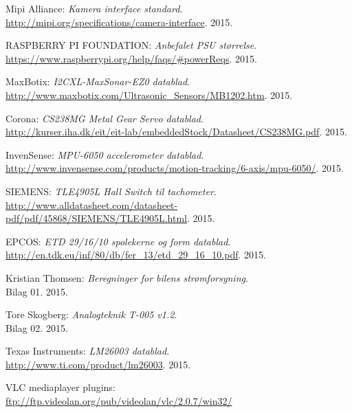 \renewcommand{\bibname}{Litteraturliste}
\fancyhead[CE,CO]{}
\fancyfoot[CE,CO]{}
\begin{thebibliography}{2}


 Mipi Alliance: \textit{Kamera interface standard}. \\ 
\url{http://mipi.org/specifications/camera-interface}. 2015.

 RASPBERRY PI FOUNDATION: \textit{Anbefalet PSU størrelse}. \\
\url{https://www.raspberrypi.org/help/faqs/#powerReqs}. 2015.

 MaxBotix: \textit{I2CXL-MaxSonar-EZ0 datablad}. \\
\url{http://www.maxbotix.com/Ultrasonic_Sensors/MB1202.htm}. 2015.

 Corona: \textit{CS238MG Metal Gear Servo datablad}. \\
\url{http://kurser.iha.dk/eit/eit-lab/embeddedStock/Datasheet/CS238MG.pdf}. 2015.

 InvenSense: \textit{MPU-6050 accelerometer datablad}. \\
\url{http://www.invensense.com/products/motion-tracking/6-axis/mpu-6050/}. 2015.

 SIEMENS: \textit{TLE4905L Hall Switch til tachometer}. \\
\url{http://www.alldatasheet.com/datasheet-pdf/pdf/45868/SIEMENS/TLE4905L.html}. 2015.

 EPCOS: \textit{ETD 29/16/10 spolekerne og form datablad}. \\
\url{http://en.tdk.eu/inf/80/db/fer_13/etd_29_16_10.pdf}. 2015.

 Kristian Thomsen: \textit{Beregninger for bilens strømforsyning}. \\
Bilag 01. 2015.

 Tore Skogberg: \textit{Analogteknik T-005 v1.2}.\\
Bilag 02. 2015.

 Texas Instruments: \textit{LM26003 datablad}. \\
\url{http://www.ti.com/product/lm26003}. 2015.

 VLC mediaplayer plugins: \\
\url{ftp://ftp.videolan.org/pub/videolan/vlc/2.0.7/win32/}

\end{thebibliography}